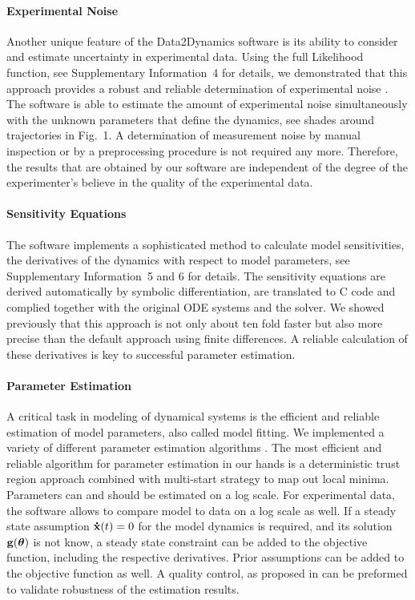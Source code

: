 \documentclass{bioinfo}
\begin{document}
\paragraph{Experimental Noise}
Another unique feature of the Data2Dynamics software is its ability to consider and estimate uncertainty in experimental data. Using the full Likelihood function, see Supplementary Information~4 for details, we demonstrated that this approach provides a robust and reliable determination of experimental noise \citep{Raue:2012zt}. The software is able to estimate the amount of experimental noise simultaneously with the unknown parameters that define the dynamics, see shades around trajectories in Fig.~1. A determination of measurement noise by manual inspection or by a preprocessing procedure is not required any more. Therefore, the results that are obtained by our software are independent of the degree of the experimenter's believe in the quality of the experimental data.

\paragraph{Sensitivity Equations}
The software implements a sophisticated method to calculate model sensitivities, the derivatives of the dynamics with respect to model parameters, see Supplementary Information~5 and 6 for details. The sensitivity equations are derived automatically by symbolic differentiation, are translated to C code and complied together with the original ODE systems and the solver. We showed previously \citep{Raue:2012zt} that this approach is not only about ten fold faster but also more precise than the default approach using finite differences. A reliable calculation of these derivatives is key to successful parameter estimation. 

\paragraph{Parameter Estimation}
A critical task in modeling of dynamical systems is the efficient and reliable estimation of model parameters, also called model fitting. We implemented a variety of different parameter estimation algorithms \citep{Raue:2012zt}. The most efficient and reliable algorithm for parameter estimation in our hands is a deterministic trust region approach combined with multi-start strategy to map out local minima. Parameters can and should be estimated on a log scale. For experimental data, the software allows to compare model to data on a log scale as well. If a steady state assumption ${\bf \dot  x}(t) = 0$ for the model dynamics is required, and its solution ${\bf g}(\boldsymbol{\theta})$ is not know, a steady state constraint can be added to the objective function, including the respective derivatives. Prior assumptions can be added to the objective function as well. A quality control, as proposed in \citet{Raue:2012zt} can be preformed to validate robustness of the estimation results.
\end{document}
